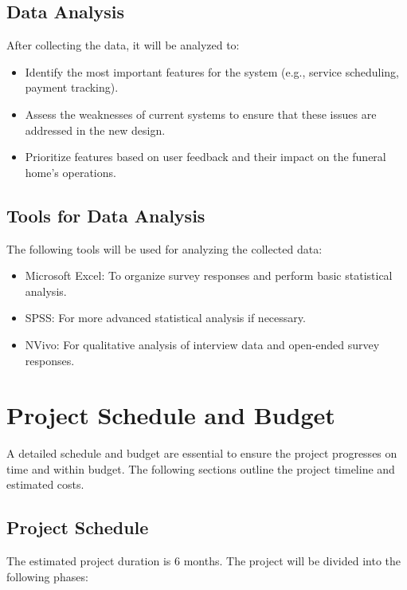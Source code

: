 \documentclass[a4paper,12pt]{report}
\begin{document}
\subsection{Data Analysis}
After collecting the data, it will be analyzed to:
\begin{itemize}
    \item Identify the most important features for the system (e.g., service scheduling, payment tracking).
    \item Assess the weaknesses of current systems to ensure that these issues are addressed in the new design.
    \item Prioritize features based on user feedback and their impact on the funeral home's operations.
\end{itemize}


\subsection{Tools for Data Analysis}
The following tools will be used for analyzing the collected data:
\begin{itemize}
    \item Microsoft Excel: To organize survey responses and perform basic statistical analysis.
    \item SPSS: For more advanced statistical analysis if necessary.
    \item NVivo: For qualitative analysis of interview data and open-ended survey responses.
\end{itemize}

\section{Project Schedule and Budget}
A detailed schedule and budget are essential to ensure the project progresses on time and within budget. The following sections outline the project timeline and estimated costs.

\subsection{Project Schedule}
The estimated project duration is 6 months. The project will be divided into the following phases:
\end{document}

